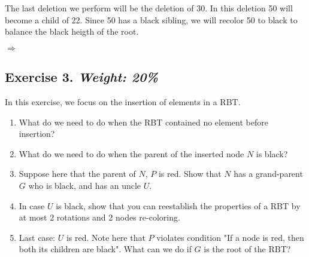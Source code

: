\documentclass{article}
\begin{document}
The last deletion we perform will be the deletion of 30. In this deletion 50 will become a child of 22. Since 50 has a black sibling, we will recolor 50 to black to balance the black heigth of the root.
\begin{center}
$\Rightarrow$
\end{center}

\newpage
\subsection*{Exercise 3. \textit{Weight: 20\%}}
In this exercise, we focus on the insertion of elements in a RBT.
\begin{enumerate}
	\item What do we need to do when the RBT contained no element before insertion?
	\item What do we need to do when the parent of the inserted node $N$ is black?
	\item Suppose here that the parent of $N$, $P$ is red. Show that $N$ has a grand-parent $G$ who is black, and has an uncle $U$.
	\item In case $U$ is black, show that you can reestablish the properties of a RBT by at most 2 rotations and 2 nodes re-coloring.
	\item Last case: $U$ is red. Note here that $P$ violates condition "If a node is red, then both its children are black". What can we do if $G$ is the root of the RBT?
\end{enumerate}
\end{document}
